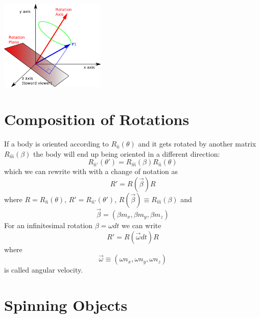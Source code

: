 \documentclass[12pt]{article}
\begin{document}
\begin{center}
\includegraphics[width=5cm]{images/rotation.png}
\end{center}

\section{Composition of Rotations}

If a body is oriented according to $R_{\hat n}(\theta)$ and it gets rotated by another matrix $R_{\hat m}(\beta)$ the body will end up being oriented in a different direction:
\begin{equation}
R_{\hat n'}(\theta') = R_{\hat m}(\beta) R_{\hat n}(\theta)
\end{equation}
which we can rewrite with with a change of notation as
\begin{equation}
R' = R(\vec \beta) R
\end{equation}
where $R = R_{\hat n}(\theta)$, $R'=R_{\hat n'}(\theta')$, $R(\vec \beta)\equiv R_{\hat m}(\beta)$ and
\begin{equation}
\vec \beta = (\beta m_x, \beta m_y, \beta m_z)
\end{equation}
For an infinitesimal rotation $\beta = \omega dt$ we can write
\begin{equation}
R' = R(\vec \omega dt) R
\end{equation}
where
\begin{equation}
\vec \omega \equiv (\omega n_x, \omega n_y, \omega n_z)
\label{avelocity}
\end{equation}
is called angular velocity.

\section{Spinning Objects}
\end{document}
